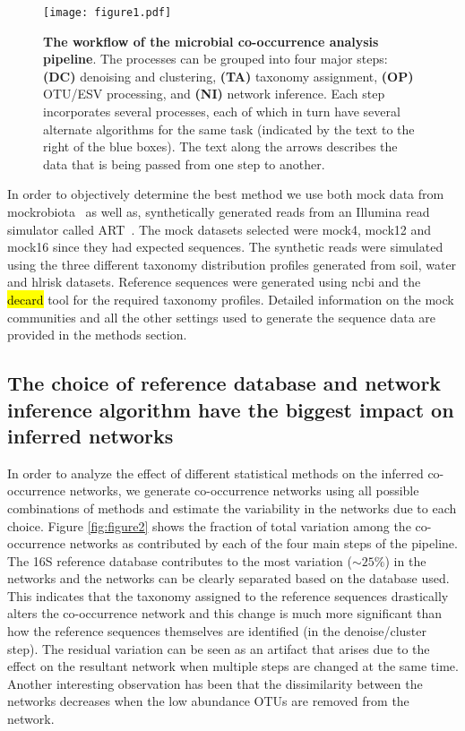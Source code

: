  \begin{figure}[h]
    \centering
    \texttt{[image: figure1.pdf]}
    \caption{
      \textbf{The workflow of the microbial co-occurrence analysis pipeline}.
      The processes can be grouped into four major steps: \textbf{(DC)} denoising and clustering, \textbf{(TA)} taxonomy assignment, \textbf{(OP)} OTU/ESV processing, and \textbf{(NI)} network inference.
      Each step incorporates several processes, each of which in turn have several alternate algorithms for the same task (indicated by the text to the right of the blue boxes).
      The text along the arrows describes the data that is being passed from one step to another.
    }
    \label{fig:figure1}
  \end{figure}

  In order to objectively determine the best method we use both mock data from mockrobiota~\cite{Bokulich2016} as well as, synthetically generated reads from an Illumina read simulator called ART~\cite{Huang2012}.
  The mock datasets selected were mock4, mock12 and mock16 since they had expected sequences.
  The synthetic reads were simulated using the three different taxonomy distribution profiles generated from soil, water and hl{risk} datasets.
  Reference sequences were generated using \ac{ncbi} and the \hl{decard} tool \cite{Golob2017} for the required taxonomy profiles.
  Detailed information on the mock communities and all the other settings used to generate the sequence data are provided in the methods section.


  \FloatBarrier

  \subsection*{The choice of reference database and network inference algorithm have the biggest impact on inferred networks}

  In order to analyze the effect of different statistical methods on the inferred co-occurrence networks, we generate co-occurrence networks using all possible combinations of methods and estimate the variability in the networks due to each choice.
  Figure \ref{fig:figure2} shows the fraction of total variation among the co-occurrence networks as contributed by each of the four main steps of the pipeline.
  The 16S reference database contributes to the most variation ($\sim25\%$) in the networks and the networks can be clearly separated based on the database used.
  This indicates that the taxonomy assigned to the reference sequences drastically alters the co-occurrence network and this change is much more significant than how the reference sequences themselves are identified (in the denoise/cluster step).
  The residual variation can be seen as an artifact that arises due to the effect on the resultant network when multiple steps are changed at the same time.
  Another interesting observation has been that the dissimilarity between the networks decreases when the low abundance OTUs are removed from the network.

